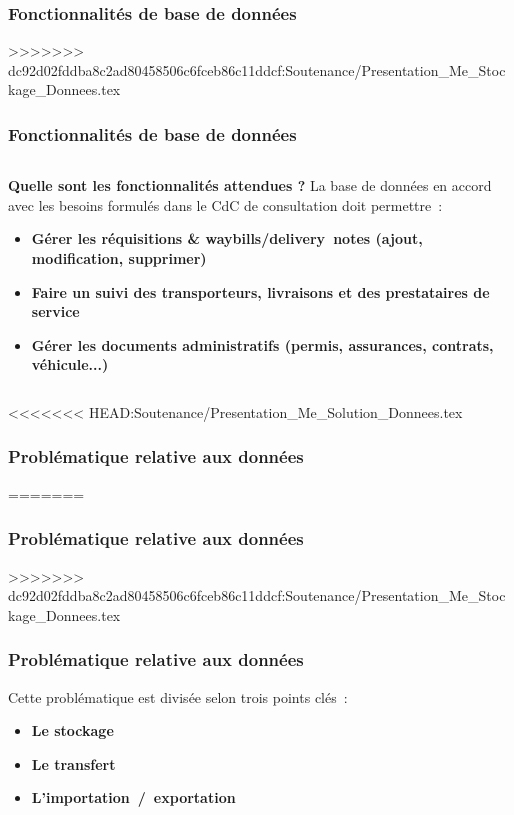\subsubsection{Fonctionnalités de base de données}
>>>>>>> dc92d02fddba8c2ad80458506c6fceb86c11ddcf:Soutenance/Presentation_Me_Stockage_Donnees.tex
\begin{frame}
\frametitle{Fonctionnalités de base de données}
\begin{columns}[c]
\begin{column}{12cm}
\begin{block}{\textbf{Quelle sont les fonctionnalités attendues ?}}
La base de données en accord avec les besoins formulés dans le CdC de consultation doit permettre~:
\begin{itemize}
\item<2-> \textbf{Gérer les réquisitions \& waybills/delivery~notes (ajout, modification, supprimer)}
\item<3-> \textbf{Faire un suivi des transporteurs, livraisons et des prestataires de service}
\item<4-> \textbf{Gérer les documents administratifs (permis, assurances, contrats, véhicule...)}
\end{itemize}
\end{block}
\end{column}
\end{columns}
\end{frame}

<<<<<<< HEAD:Soutenance/Presentation_Me_Solution_Donnees.tex
\subsubsection[Problématique relative aux données]{Problématique relative aux données}
=======
\subsubsection{Problématique relative aux données}
>>>>>>> dc92d02fddba8c2ad80458506c6fceb86c11ddcf:Soutenance/Presentation_Me_Stockage_Donnees.tex
\begin{frame}
\frametitle{Problématique relative aux données}
Cette problématique est divisée selon trois points clés~:
\begin{itemize}
	\item<2-> \textbf{Le stockage}
	\item<3-> \textbf{Le transfert}
	\item<4-> \textbf{L'importation~/~exportation}
\end{itemize}
\end{frame}

